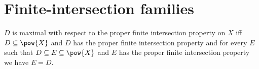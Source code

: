 \section{Finite-intersection families}





\begin{definition}\label{maximal_proper_finite_intersection_property_on}
    $D$ is maximal with respect to the proper finite intersection property on $X$ iff
        $D\subseteq\pow{X}$ and
        $D$ has the proper finite intersection property and
        for every $E$ such that $D\subseteq E\subseteq\pow{X}$ and
            $E$ has the proper finite intersection property we have $E=D$.
\end{definition}

